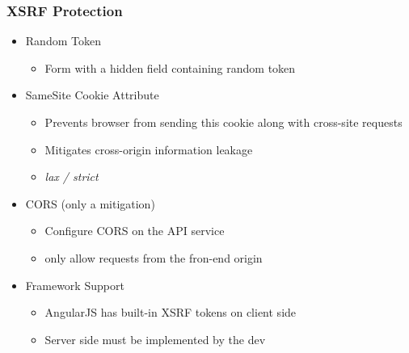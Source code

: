 \subsubsection{XSRF Protection}
\begin{itemize}
    \item Random Token
    \begin{itemize}
        \item Form with a hidden field containing random token
    \end{itemize}
    \item SameSite Cookie Attribute
    \begin{itemize}
        \item Prevents browser from sending this cookie along with cross-site requests
        \item Mitigates cross-origin information leakage
        \item \textit{lax / strict}
    \end{itemize}
    \item CORS (only a mitigation)
    \begin{itemize}
        \item Configure CORS on the API service
        \item only allow requests from the fron-end origin
    \end{itemize}
    \item Framework Support
    \begin{itemize}
        \item AngularJS has built-in XSRF tokens on client side
        \item Server side must be implemented by the dev
    \end{itemize}
\end{itemize}

